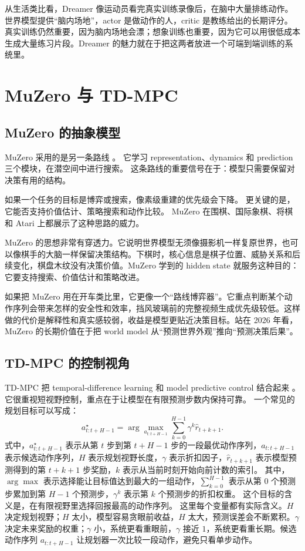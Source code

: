 \documentclass[11pt,a4paper]{ctexart}
\begin{document}
从生活类比看，Dreamer 像运动员看完真实训练录像后，在脑中大量排练动作。世界模型提供“脑内场地”，actor 是做动作的人，critic 是教练给出的长期评分。真实训练仍然重要，因为脑内场地会漂；想象训练也重要，因为它可以用很低成本生成大量练习片段。Dreamer 的魅力就在于把这两者放进一个可端到端训练的系统里。

\section{MuZero 与 TD-MPC}

\subsection{MuZero 的抽象模型}

MuZero 采用的是另一条路线 \cite{schrittwieser2020muzero}。
它学习 representation、dynamics 和 prediction 三个模块，在潜空间中进行搜索。
这条路线的重要信号在于：模型只需要保留对决策有用的结构。

如果一个任务的目标是博弈或搜索，像素级重建的优先级会下降。
更关键的是，它能否支持价值估计、策略搜索和动作比较。
MuZero 在围棋、国际象棋、将棋和 Atari 上都展示了这种思路的威力。

MuZero 的思想非常有穿透力。它说明世界模型无须像摄影机一样复原世界，也可以像棋手的大脑一样保留决策结构。下棋时，核心信息是棋子位置、威胁关系和后续变化，棋盘木纹没有决策价值。MuZero 学到的 hidden state 就服务这种目的：它要支持搜索、价值估计和策略改进。

如果把 MuZero 用在开车类比里，它更像一个“路线博弈器”。它重点判断某个动作序列会带来怎样的安全性和效率，挡风玻璃前的完整视频生成优先级较低。这样做的代价是解释性和真实感较弱，收益是模型更贴近决策目标。站在 2026 年看，MuZero 的长期价值在于把 world model 从“预测世界外观”推向“预测决策后果”。

\subsection{TD-MPC 的控制视角}

TD-MPC 把 temporal-difference learning 和 model predictive control 结合起来 \cite{hansen2022tdmpc}。
它很重视短视野控制，重点在于让模型在有限预测步数内保持可靠。
一个常见的规划目标可以写成：
\begin{equation}
  a^\star_{t:t+H-1}
  =
  \arg\max_{a_{t:t+H-1}}
  \sum_{k=0}^{H-1}\gamma^k \hat r_{t+k+1}.
\end{equation}
式中，$a^\star_{t:t+H-1}$ 表示从第 $t$ 步到第 $t+H-1$ 步的一段最优动作序列，$a_{t:t+H-1}$ 表示候选动作序列，$H$ 表示规划视野长度，$\gamma$ 表示折扣因子，$\hat r_{t+k+1}$ 表示模型预测得到的第 $t+k+1$ 步奖励，$k$ 表示从当前时刻开始向前计数的索引。
其中，$\arg\max$ 表示选择能让目标值达到最大的一组动作，$\sum_{k=0}^{H-1}$ 表示从第 $0$ 个预测步累加到第 $H-1$ 个预测步，$\gamma^k$ 表示第 $k$ 个预测步的折扣权重。
这个目标的含义是，在有限视野里选择回报最高的动作序列。
这里每个变量都有实际含义。$H$ 决定规划视野；$H$ 太小，模型容易贪眼前收益，$H$ 太大，预测误差会不断累积。$\gamma$ 决定未来奖励的权重；$\gamma$ 小，系统更看重眼前，$\gamma$ 接近 $1$，系统更看重长期。候选动作序列 $a_{t:t+H-1}$ 让规划器一次比较一段动作，避免只看单步动作。
\end{document}
